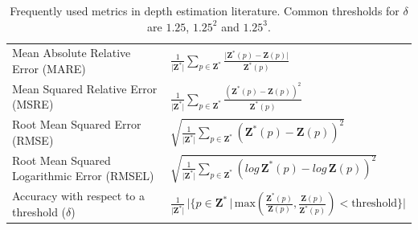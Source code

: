 \begingroup
\renewcommand{\arraystretch}{2.}
\begin{table}
	\begin{tabular}{l|l}
	Mean Absolute Relative Error (MARE) & $\frac{1}{\big| \mathbf{Z}^{*} \big|}\sum_{p \in \mathbf{Z}^{*}} \frac {\big| \mathbf{Z}^{*}(p) - \mathbf{Z}(p) \big|} {\mathbf{Z}^{*}(p)}$ \\
	Mean Squared Relative Error (MSRE) & $\frac{1}{\big| \mathbf{Z}^{*} \big|}\sum_{p \in \mathbf{Z}^{*}} \frac {\left( \mathbf{Z}^{*}(p) - \mathbf{Z}(p) \right)^{2}} {\mathbf{Z}^{*}(p)}$ \\
	Root Mean Squared Error (RMSE) & $\sqrt{
		\frac{1}{\big| \mathbf{Z}^{*} \big|}\sum_{p \in \mathbf{Z}^{*}} \left( \mathbf{Z}^{*}(p) - \mathbf{Z}(p) \right)^{2}
	}$ \\
	Root Mean Squared Logarithmic Error (RMSEL) & $\sqrt{
		\frac{1}{\big| \mathbf{Z}^{*} \big|}\sum_{p \in \mathbf{Z}^{*}} \left( log \, \mathbf{Z}^{*}(p) - log \, \mathbf{Z}(p) \right)^{2}
	}$ \\
	Accuracy with respect to a threshold ($\delta$) & $\frac{1}{\big| \mathbf{Z}^{*} \big|} \, \big| \{p \in \mathbf{Z}^{*} \, | \, \text{max}(
		\frac{\mathbf{Z}^{*}(p)}{\mathbf{Z}(p)},
		\frac{\mathbf{Z}(p)}{\mathbf{Z}^{*}(p)}
	) < \text{threshold} \} \big| $\\
	\end{tabular}
\caption{
    Frequently used metrics in depth estimation literature.
    Common thresholds for $\delta$ are $1.25$, $1.25^{2}$ and $1.25^{3}$.
    \label{t:metrics}
}
\end{table}
\endgroup

